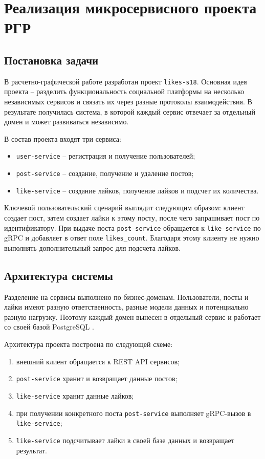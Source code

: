 \chapter{Реализация микросервисного проекта РГР}

\section{Постановка задачи}

В расчетно-графической работе разработан проект \texttt{likes-s18}. Основная идея проекта --
разделить функциональность социальной платформы на несколько независимых сервисов и связать их
через разные протоколы взаимодействия. В результате получилась система, в которой каждый сервис
отвечает за отдельный домен и может развиваться независимо.

В состав проекта входят три сервиса:
\begin{itemize}
    \item \texttt{user-service} -- регистрация и получение пользователей;
    \item \texttt{post-service} -- создание, получение и удаление постов;
    \item \texttt{like-service} -- создание лайков, получение лайков и подсчет их количества.
\end{itemize}

Ключевой пользовательский сценарий выглядит следующим образом: клиент создает пост, затем
создает лайки к этому посту, после чего запрашивает пост по идентификатору. При выдаче поста
\texttt{post-service} обращается к \texttt{like-service} по gRPC и добавляет в ответ поле
\texttt{likes\_count}. Благодаря этому клиенту не нужно выполнять дополнительный запрос для
подсчета лайков.

\section{Архитектура системы}

Разделение на сервисы выполнено по бизнес-доменам. Пользователи, посты и лайки имеют разную
ответственность, разные модели данных и потенциально разную нагрузку. Поэтому каждый домен
вынесен в отдельный сервис и работает со своей базой PostgreSQL \cite{postgres_docs}.

Архитектура проекта построена по следующей схеме:
\begin{enumerate}
    \item внешний клиент обращается к REST API сервисов;
    \item \texttt{post-service} хранит и возвращает данные постов;
    \item \texttt{like-service} хранит данные лайков;
    \item при получении конкретного поста \texttt{post-service} выполняет gRPC-вызов в
    \texttt{like-service};
    \item \texttt{like-service} подсчитывает лайки в своей базе данных и возвращает результат.
\end{enumerate}

